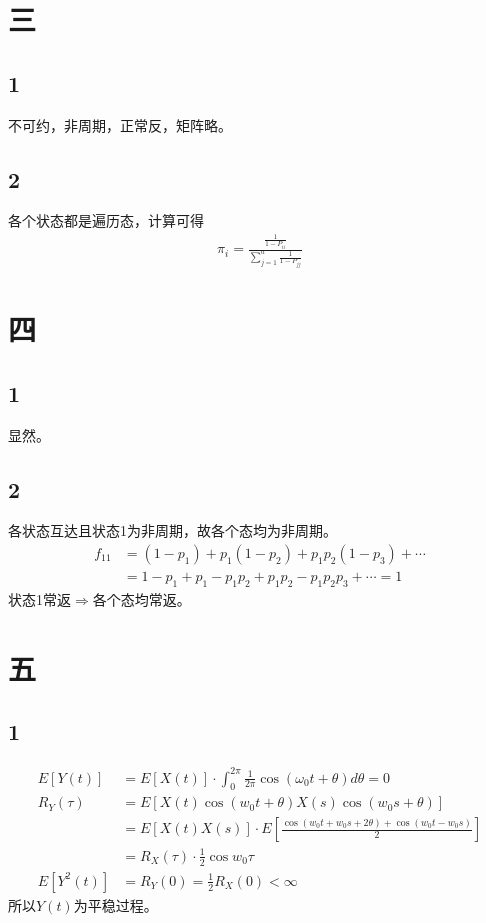 \documentclass{article}
\begin{document}
\section*{三}
\subsection*{1}
不可约，非周期，正常反，矩阵略。
\subsection*{2}
各个状态都是遍历态，计算可得
\begin{align*}
    \pi_{i}=\frac{\frac{1}{1-P_{ii}}}{\sum_{j=1}^{a}\frac{1}{1-P_{jj}}}
\end{align*}
\section*{四}
\subsection*{1}
显然。
\subsection*{2}
各状态互达且状态1为非周期，故各个态均为非周期。
\begin{align*}
    f_{11}&=(1-p_{1})+p_{1}(1-p_{2})+p_{1}p_{2}(1-p_{3})+\cdots\\
    &=1-p_{1}+p_{1}-p_{1}p_{2}+p_{1}p_{2}-p_{1}p_{2}p_{3}+\cdots=1
\end{align*}
状态1常返$\Rightarrow$各个态均常返。
\section*{五}
\subsection*{1}
\begin{align*}
    E[Y(t)]&=E[X(t)]\cdot\int_{0}^{2\pi}\frac{1}{2\pi}\cos(\omega_{0}t+\theta)d\theta=0\\
    R_{Y}(\tau)&=E[X(t)\cos(w_{0}t+\theta)X(s)\cos(w_{0}s+\theta)]\\
    &=E[X(t)X(s)]\cdot E[\frac{\cos(w_{0}t+w_{0}s+2\theta)+\cos(w_{0}t-w_{0}s)}{2}]\\
    &=R_{X}(\tau)\cdot\frac{1}{2}\cos w_{0}\tau \\
    E[Y^{2}(t)]&=R_{Y}(0)=\frac{1}{2}R_{X}(0)<\infty 
\end{align*}
所以$Y(t)$为平稳过程。
\end{document}
